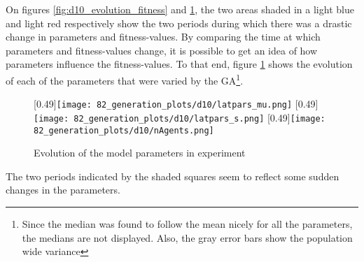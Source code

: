 On figures \ref{fig:d10_evolution_fitness} and \ref{fig:d10_evolution_parameters}, the two areas shaded in a light blue and light red respectively show the two periods during which there was a drastic change in parameters and fitness-values. By comparing the time at which parameters and fitness-values change, it is possible to get an idea of how parameters influence the fitness-values. To that end, figure \ref{fig:d10_evolution_parameters} shows the evolution of each of the parameters that were varied by the GA\footnote{Since the median was found to follow the mean nicely for all the parameters, the medians are not displayed. Also, the gray error bars show the population wide variance}.
\begin{figure}
	\centering
	[0.49\linewidth]{\texttt{[image: 82\_generation\_plots/d10/latpars\_mu.png]}}
	[0.49\linewidth]{\texttt{[image: 82\_generation\_plots/d10/latpars\_s.png]}}
	[0.49\linewidth]{\texttt{[image: 82\_generation\_plots/d10/nAgents.png]}}
	\caption{Evolution of the model parameters in experiment \dten}
	\label{fig:d10_evolution_parameters}
\end{figure}

The two periods indicated by the shaded squares seem to reflect some sudden changes in the parameters.

